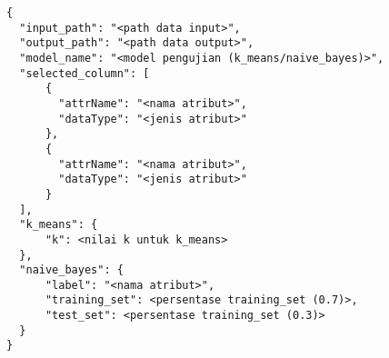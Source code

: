 \newpage
\begin{lstlisting}[basicstyle=\ttfamily, frame=single,
	columns=fullflexible, keepspaces=true, breaklines=true, label=pengujian_json, caption=Input JSON untuk Pengujian Data]
{
  "input_path": "<path data input>",
  "output_path": "<path data output>",
  "model_name": "<model pengujian (k_means/naive_bayes)>",
  "selected_column": [
      {
        "attrName": "<nama atribut>",
        "dataType": "<jenis atribut>"
      },
      {
        "attrName": "<nama atribut>",
        "dataType": "<jenis atribut>"
      }
  ],
  "k_means": {
      "k": <nilai k untuk k_means>
  },
  "naive_bayes": {
      "label": "<nama atribut>",
      "training_set": <persentase training_set (0.7)>,
      "test_set": <persentase training_set (0.3)>
  }
}
\end{lstlisting}




